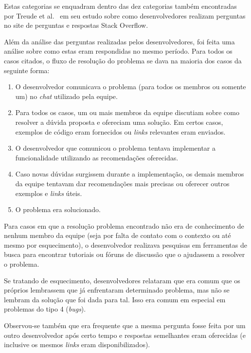 Estas categorias se enquadram dentro das dez categorias também encontradas por Treude et al.~\cite{Treude2011} em seu estudo sobre como desenvolvedores realizam perguntas no site de perguntas e respostas Stack Overflow.

Além da análise das perguntas realizadas pelos desenvolvedores, foi feita uma análise sobre como estas eram respondidas no mesmo período. Para todos os casos citados, o fluxo de resolução do problema se dava na maioria dos casos da seguinte forma:


\begin{enumerate}[i]
  \item O desenvolvedor comunicava o problema (para todos os membros ou somente um) no \textit{chat} utilizado pela equipe.
  \item Para todos os casos, um ou mais membros da equipe discutiam sobre como resolver a dúvida proposta e ofereciam uma solução. Em certos casos, exemplos de código eram fornecidos ou \textit{links} relevantes eram enviados.
  \item O desenvolvedor que comunicou o problema tentava implementar a funcionalidade utilizando as recomendações oferecidas.
  \item Caso novas dúvidas surgissem durante a implementação, os demais membros da equipe tentavam dar recomendações mais precisas ou oferecer outros exemplos e \textit{links} úteis.
  \item O problema era solucionado.
\end{enumerate}

Para casos em que a resolução problema encontrado não era de conhecimento de nenhum membro da equipe (seja por falta de contato com o contexto ou até mesmo por esquecimento), o desenvolvedor realizava pesquisas em ferramentas de busca para encontrar tutoriais ou fóruns de discussão que o ajudassem a resolver o problema.

Se tratando de esquecimento, desenvolvedores relataram que era comum que os próprios lembrassem que já enfrentaram determinado problema, mas não se lembram da solução que foi dada para tal. Isso era comum em especial em problemas do tipo 4 (\textit{bugs}).

Observou-se também que era frequente que a mesma pergunta fosse feita por um outro desenvolvedor após certo tempo e respostas semelhantes eram oferecidas (e inclusive os mesmos \textit{links} eram disponibilizados).


